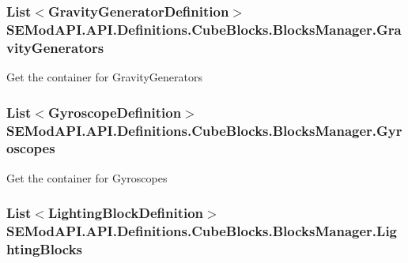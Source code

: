 \subsubsection[{Gravity\+Generators}]{\setlength{\rightskip}{0pt plus 5cm}List$<${\bf Gravity\+Generator\+Definition}$>$ S\+E\+Mod\+A\+P\+I.\+A\+P\+I.\+Definitions.\+Cube\+Blocks.\+Blocks\+Manager.\+Gravity\+Generators\hspace{0.3cm}{\ttfamily [get]}}\label{class_s_e_mod_a_p_i_1_1_a_p_i_1_1_definitions_1_1_cube_blocks_1_1_blocks_manager_a9e9859ba905cee95abf2235a4474f6f7}


Get the container for Gravity\+Generators 

\hypertarget{class_s_e_mod_a_p_i_1_1_a_p_i_1_1_definitions_1_1_cube_blocks_1_1_blocks_manager_a4235abab99951689005dcd2ebff6ca3f}{}
\subsubsection[{Gyroscopes}]{\setlength{\rightskip}{0pt plus 5cm}List$<${\bf Gyroscope\+Definition}$>$ S\+E\+Mod\+A\+P\+I.\+A\+P\+I.\+Definitions.\+Cube\+Blocks.\+Blocks\+Manager.\+Gyroscopes\hspace{0.3cm}{\ttfamily [get]}}\label{class_s_e_mod_a_p_i_1_1_a_p_i_1_1_definitions_1_1_cube_blocks_1_1_blocks_manager_a4235abab99951689005dcd2ebff6ca3f}


Get the container for Gyroscopes 

\hypertarget{class_s_e_mod_a_p_i_1_1_a_p_i_1_1_definitions_1_1_cube_blocks_1_1_blocks_manager_a68bf9b0208c9a2aaca2f45cd7b0c60b1}{}
\subsubsection[{Lighting\+Blocks}]{\setlength{\rightskip}{0pt plus 5cm}List$<${\bf Lighting\+Block\+Definition}$>$ S\+E\+Mod\+A\+P\+I.\+A\+P\+I.\+Definitions.\+Cube\+Blocks.\+Blocks\+Manager.\+Lighting\+Blocks\hspace{0.3cm}{\ttfamily [get]}}\label{class_s_e_mod_a_p_i_1_1_a_p_i_1_1_definitions_1_1_cube_blocks_1_1_blocks_manager_a68bf9b0208c9a2aaca2f45cd7b0c60b1}


